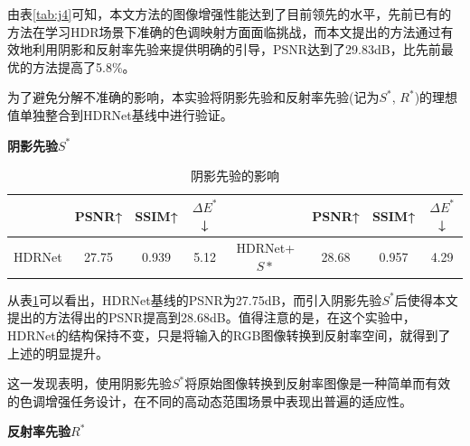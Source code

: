 \documentclass[
    type = master, %
    degree = academic,        %
    decl-page,  %
  ]{njuthesis}
\begin{document}
由表\ref{tab:j4}可知，本文方法的图像增强性能达到了目前领先的水平，先前已有的方法在学习HDR场景下准确的色调映射方面面临挑战，而本文提出的方法通过有效地利用阴影和反射率先验来提供明确的引导，PSNR达到了29.83dB，比先前最优的方法提高了5.8\%。

为了避免分解不准确的影响，本实验将阴影先验和反射率先验(记为$S^*$, $R^*$)的理想值单独整合到HDRNet基线中进行验证。

\textbf{阴影先验$S^*$}

\begin{table}[h]
\centering                %
\caption{阴影先验的影响}  %
\label{tab:j1a} 

\begin{tabular}{cccc|cccc}
\hline
       & PSNR↑ & SSIM↑ & $\Delta E^*$↓ &           & PSNR↑ & SSIM↑ & $\Delta E^*$↓  \\ \hline
HDRNet & 27.75 & 0.939 & 5.12 & HDRNet+$S*$ & 28.68 & 0.957 & 4.29 \\ \hline

\end{tabular}
\end{table}
从表\ref{tab:j1a}可以看出，HDRNet基线的PSNR为27.75dB，而引入阴影先验$S^*$后使得本文提出的方法得出的PSNR提高到28.68dB。值得注意的是，在这个实验中，HDRNet的结构保持不变，只是将输入的RGB图像转换到反射率空间，就得到了上述的明显提升。

这一发现表明，使用阴影先验$S^*$将原始图像转换到反射率图像是一种简单而有效的色调增强任务设计，在不同的高动态范围场景中表现出普遍的适应性。

\textbf{反射率先验$R^*$}
\end{document}
